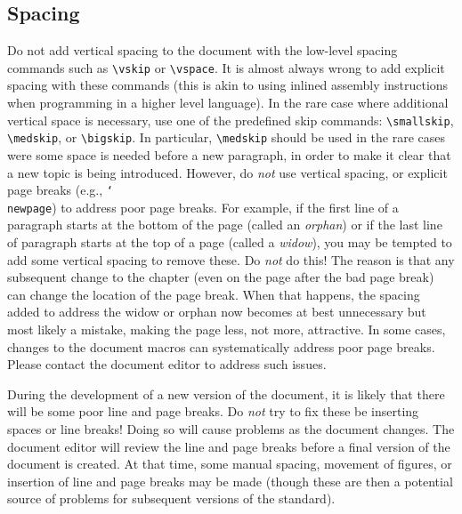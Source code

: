 \documentclass[letterpaper,twoside,11pt,fleqn]{article}
\def\cmd#1{\texttt{\char`\\#1}}
\begin{document}
\subsection{Spacing}
Do not add vertical spacing to the document with the low-level spacing
commands such as \verb+\vskip+ or \verb+\vspace+.  It is almost always
wrong to add explicit spacing with these commands (this is akin to
using inlined assembly instructions when programming in a higher level
language).  In the rare case
where additional vertical space is necessary, use one of the
predefined skip commands: \verb+\smallskip+, \verb+\medskip+, or
\verb+\bigskip+.
In particular, \verb+\medskip+ should be used in the rare cases were some
space is needed before a new paragraph, in order to make it clear that a
new topic is being introduced.
However, do \emph{not} use vertical spacing, or explicit page
breaks (e.g., \cmd{newpage}) to address poor page breaks.
For example, if the first line of a paragraph starts at the bottom of
the page (called an \emph{orphan}) or if the last line of paragraph
starts at the top of a page (called a \emph{widow}), you may be
tempted to add some vertical spacing to remove these.
Do \emph{not} do this!
The reason is that any subsequent change to the chapter (even on the
page after the bad page break) can change the location of the page
break.
When that happens, the spacing added to address the widow or orphan
now becomes at best unnecessary but most likely a mistake, making the
page less, not more, attractive.
In some cases, changes to the document macros can systematically
address poor page breaks.
Please contact the document editor to address such issues.

During the development of a new version of the document, it is likely
that there will be some poor line and page breaks.
Do \emph{not} try to fix these be inserting spaces or line breaks!
Doing so will cause problems as the document changes. The document
editor will review the line and page breaks before a final version of
the document is created. At that time, some manual spacing, movement
of figures, or insertion of line and page breaks may be made (though
these are then a potential source of problems for subsequent versions
of the standard).
\end{document}
